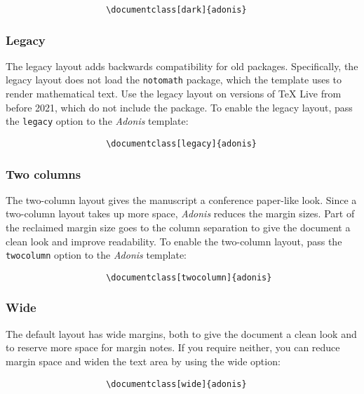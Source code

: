 \documentclass{adonis}
\begin{document}
				\begin{verbatim}
					\documentclass[dark]{adonis}
				\end{verbatim}
			
			\subsubsection{Legacy}
			
				The legacy layout adds backwards compatibility for old packages.
				Specifically, the legacy layout does not load the \texttt{notomath} package, which the template uses to render mathematical text.
				Use the legacy layout on versions of TeX Live from before 2021, which do not include the package.
				To enable the legacy layout, pass the \texttt{legacy} option to the \textit{Adonis} template:
				
				\begin{verbatim}
					\documentclass[legacy]{adonis}
				\end{verbatim}
		
			\subsubsection{Two columns}
			
				The two-column layout gives the manuscript a conference paper-like look.
				Since a two-column layout takes up more space, \textit{Adonis} reduces the margin sizes.
				Part of the reclaimed margin size goes to the column separation to give the document a clean look and improve readability.
				To enable the two-column layout, pass the \texttt{twocolumn} option to the \textit{Adonis} template:
			
				\begin{verbatim}
					\documentclass[twocolumn]{adonis}
				\end{verbatim}
			
			\subsubsection{Wide}
			
				The default layout has wide margins, both to give the document a clean look and to reserve more space for margin notes.
				If you require neither, you can reduce margin space and widen the text area by using the wide option:
			
				\begin{verbatim}
					\documentclass[wide]{adonis}
				\end{verbatim}
	
\end{document}
